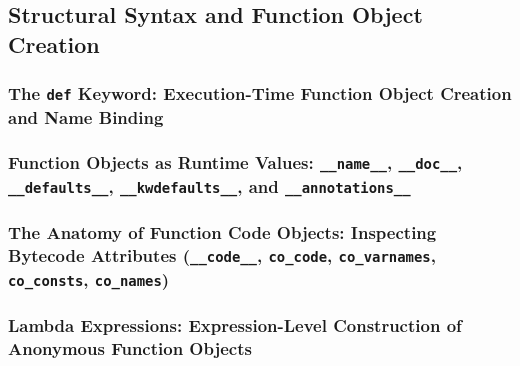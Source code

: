 \subsection{Structural Syntax and Function Object Creation}
\subsubsection{The \texttt{def} Keyword: Execution-Time Function Object Creation and Name Binding}
\subsubsection{Function Objects as Runtime Values: \texttt{\_\_name\_\_}, \texttt{\_\_doc\_\_}, \texttt{\_\_defaults\_\_}, \texttt{\_\_kwdefaults\_\_}, and \texttt{\_\_annotations\_\_}}
\subsubsection{The Anatomy of Function Code Objects: Inspecting Bytecode Attributes (\texttt{\_\_code\_\_}, \texttt{co\_code}, \texttt{co\_varnames}, \texttt{co\_consts}, \texttt{co\_names})}
\subsubsection{Lambda Expressions: Expression-Level Construction of Anonymous Function Objects}
